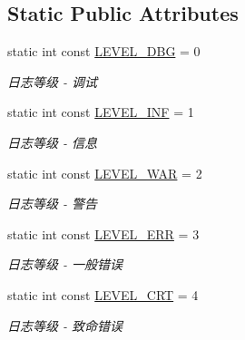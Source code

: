 \subsection*{Static Public Attributes}
\begin{DoxyCompactItemize}
\item 
\mbox{\label{class_log_aa17bb8ca4d2192d32661c3c7ca05a3f6}} 
static int const \hyperlink{class_log_aa17bb8ca4d2192d32661c3c7ca05a3f6}{L\+E\+V\+E\+L\+\_\+\+D\+BG} = 0
\begin{DoxyCompactList}\small\item\em 日志等级 -\/ 调试 \end{DoxyCompactList}\item 
\mbox{\label{class_log_a858c5b18fa5ba2b3030c0e19396b1f29}} 
static int const \hyperlink{class_log_a858c5b18fa5ba2b3030c0e19396b1f29}{L\+E\+V\+E\+L\+\_\+\+I\+NF} = 1
\begin{DoxyCompactList}\small\item\em 日志等级 -\/ 信息 \end{DoxyCompactList}\item 
\mbox{\label{class_log_a944495af10e73c8aabfa5b8ec5790c33}} 
static int const \hyperlink{class_log_a944495af10e73c8aabfa5b8ec5790c33}{L\+E\+V\+E\+L\+\_\+\+W\+AR} = 2
\begin{DoxyCompactList}\small\item\em 日志等级 -\/ 警告 \end{DoxyCompactList}\item 
\mbox{\label{class_log_a0a37b6e34e4662db8a9c6797a83a7348}} 
static int const \hyperlink{class_log_a0a37b6e34e4662db8a9c6797a83a7348}{L\+E\+V\+E\+L\+\_\+\+E\+RR} = 3
\begin{DoxyCompactList}\small\item\em 日志等级 -\/ 一般错误 \end{DoxyCompactList}\item 
\mbox{\label{class_log_a4ec0940f19651e80e6852da6c7069916}} 
static int const \hyperlink{class_log_a4ec0940f19651e80e6852da6c7069916}{L\+E\+V\+E\+L\+\_\+\+C\+RT} = 4
\begin{DoxyCompactList}\small\item\em 日志等级 -\/ 致命错误 \end{DoxyCompactList}\end{DoxyCompactItemize}


